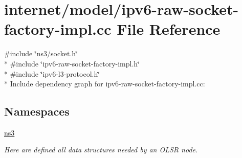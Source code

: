 \hypertarget{ipv6-raw-socket-factory-impl_8cc}{}\section{internet/model/ipv6-\/raw-\/socket-\/factory-\/impl.cc File Reference}
\label{ipv6-raw-socket-factory-impl_8cc}
{\ttfamily \#include \char`\"{}ns3/socket.\+h\char`\"{}}\\*
{\ttfamily \#include \char`\"{}ipv6-\/raw-\/socket-\/factory-\/impl.\+h\char`\"{}}\\*
{\ttfamily \#include \char`\"{}ipv6-\/l3-\/protocol.\+h\char`\"{}}\\*
Include dependency graph for ipv6-\/raw-\/socket-\/factory-\/impl.cc\+:
\subsection*{Namespaces}
\begin{DoxyCompactItemize}
\item 
 \hyperlink{namespacens3}{ns3}
\begin{DoxyCompactList}\small\item\em Here are defined all data structures needed by an O\+L\+SR node. \end{DoxyCompactList}\end{DoxyCompactItemize}
